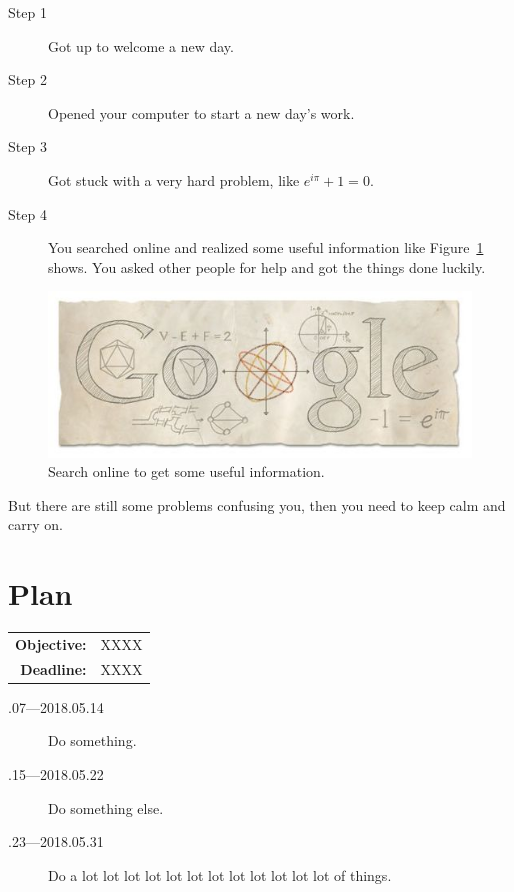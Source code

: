 \documentclass[a4paper]{article}
\begin{document}
\begin{description}
\item [Step 1]
Got up to welcome a new day.
\item[Step 2]
Opened your computer to start a new day's work.
\item[Step 3]
Got stuck with a very hard problem, like $e^{i \pi} + 1 = 0$.
\item[Step 4]
You searched online and realized some useful information like Figure~\ref{fig:google} shows. You asked other people for help and got the things done luckily.
\end{description}

\begin{figure}[hb]
    \centering
    \includegraphics{figures/google}
    \caption{Search online to get some useful information.}
    \label{fig:google}
\end{figure}

But there are still some problems confusing you, then you need to keep calm and carry on.

\section{Plan}

\begin{tabular}{rl}
	\textbf{Objective:} & XXXX \\
    \textbf{Deadline:} & XXXX 
\end{tabular}

\begin{description}
    \item[.07---2018.05.14] Do something.
    \item[.15---2018.05.22] Do something else.
    \item[.23---2018.05.31] Do a lot lot lot lot lot lot lot lot lot lot lot lot of things.
\end{description}



\end{document}
